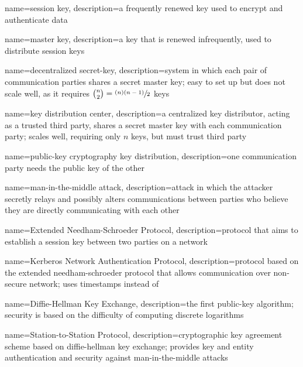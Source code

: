 {
    name={session key},
    description={a frequently renewed key used to encrypt and authenticate data}
}

{
    name={master key},
    description={a key that is renewed infrequently, used to distribute \glspl{session key}}
}

{
    name={decentralized secret-key},
    description={system in which each pair of communication parties shares a secret \gls{master key}; easy to set up but does not scale well, as it requires $\binom{n}{2}=\sfrac{(n)(n-1)}{2}$ keys}
}

{
    name={key distribution center},
    description={a centralized key distributor, acting as a trusted third party, shares a secret \gls{master key} with each communication party; scales well, requiring only $n$ keys, but must trust third party}
}

{
    name={public-key cryptography key distribution},
    description={one communication party needs the public key of the other}
}

{
    name={man-in-the-middle attack},
    description={attack in which the attacker secretly relays and possibly alters communications between parties who believe they are directly communicating with each other}
}

{
    name={Extended Needham-Schroeder Protocol},
    description={protocol that aims to establish a \gls{session key} between two parties on a network}
}

{
    name={Kerberos Network Authentication Protocol},
    description={protocol based on the \gls{extended needham-schroeder protocol} that allows communication over non-secure network; uses timestamps instead of }
}

{
    name={Diffie-Hellman Key Exchange},
    description={the first public-key algorithm; security is based on the difficulty of computing discrete logarithms}
}

{
    name={Station-to-Station Protocol},
    description={cryptographic key agreement scheme based on \gls{diffie-hellman key exchange}; provides key and entity authentication and security against \glspl{man-in-the-middle attack}}
}

